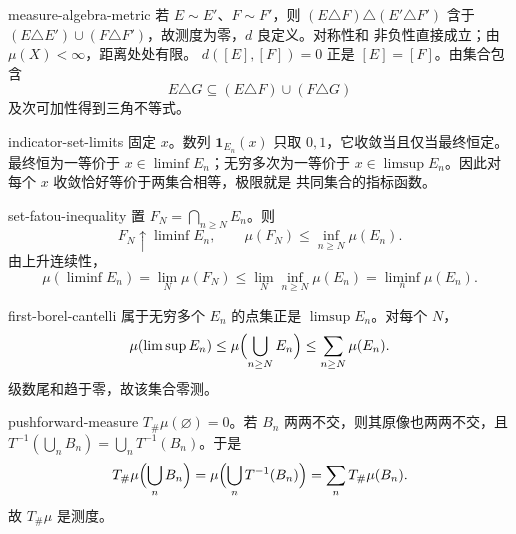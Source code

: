 \begin{solution}{measure-algebra-metric}
若 $E\sim E'$、$F\sim F'$，则
$(E\triangle F)\triangle(E'\triangle F')$ 含于
$(E\triangle E')\cup(F\triangle F')$，故测度为零，$d$ 良定义。对称性和
非负性直接成立；由 $\mu(X)<\infty$，距离处处有限。
$d([E],[F])=0$ 正是 $[E]=[F]$。由集合包含
\[
 E\triangle G\subseteq(E\triangle F)\cup(F\triangle G)
\]
及次可加性得到三角不等式。
\end{solution}

\begin{solution}{indicator-set-limits}
固定 $x$。数列 $\mathbf1_{E_n}(x)$ 只取 $0,1$，它收敛当且仅当最终恒定。
最终恒为一等价于 $x\in\liminf E_n$；无穷多次为一等价于
$x\in\limsup E_n$。因此对每个 $x$ 收敛恰好等价于两集合相等，极限就是
共同集合的指标函数。
\end{solution}

\begin{solution}{set-fatou-inequality}
置 $F_N=\bigcap_{n\ge N}E_n$。则
\[
 F_N\uparrow\liminf E_n,
 \qquad
 \mu(F_N)\le\inf_{n\ge N}\mu(E_n).
\]
由上升连续性，
\[
 \mu(\liminf E_n)=\lim_N\mu(F_N)
 \le\lim_N\inf_{n\ge N}\mu(E_n)
 =\liminf_n\mu(E_n).
\]
\end{solution}

\begin{solution}{first-borel-cantelli}
属于无穷多个 $E_n$ 的点集正是 $\limsup E_n$。对每个 $N$，
\[
 \mu(\limsup E_n)
 \le\mu\Bigl(\bigcup_{n\ge N}E_n\Bigr)
 \le\sum_{n\ge N}\mu(E_n).
\]
级数尾和趋于零，故该集合零测。
\end{solution}

\begin{solution}{pushforward-measure}
$T_\#\mu(\varnothing)=0$。若 $B_n$ 两两不交，则其原像也两两不交，且
$T^{-1}(\bigcup_nB_n)=\bigcup_nT^{-1}(B_n)$。于是
\[
 T_\#\mu\Bigl(\bigcup_nB_n\Bigr)
 =\mu\Bigl(\bigcup_nT^{-1}(B_n)\Bigr)
 =\sum_nT_\#\mu(B_n).
\]
故 $T_\#\mu$ 是测度。
\end{solution}
